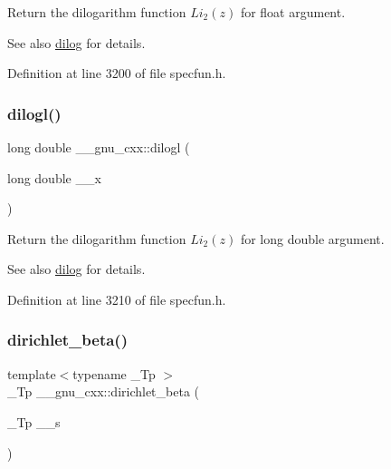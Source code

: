 Return the dilogarithm function $ Li_2(z) $ for {\ttfamily float} argument.

\begin{DoxySeeAlso}{See also}
\hyperlink{group__gnu__math__spec__func_ga4185ee1a0f9189a18085f65d52b6bc9b}{dilog} for details. 
\end{DoxySeeAlso}


Definition at line 3200 of file specfun.\+h.

\mbox{\label{group__gnu__math__spec__func_gae90c13ee690ebaf10a18a900fe2646f9}} 
\subsubsection{\texorpdfstring{dilogl()}{dilogl()}}
{\footnotesize\ttfamily long double \+\_\+\+\_\+gnu\+\_\+cxx\+::dilogl (\begin{DoxyParamCaption}\item[{long double}]{\+\_\+\+\_\+x }\end{DoxyParamCaption})\hspace{0.3cm}{\ttfamily [inline]}}

Return the dilogarithm function $ Li_2(z) $ for {\ttfamily long double} argument.

\begin{DoxySeeAlso}{See also}
\hyperlink{group__gnu__math__spec__func_ga4185ee1a0f9189a18085f65d52b6bc9b}{dilog} for details. 
\end{DoxySeeAlso}


Definition at line 3210 of file specfun.\+h.

\mbox{\label{group__gnu__math__spec__func_ga87466a2d429a2815d794acc21c882b08}} 
\subsubsection{\texorpdfstring{dirichlet\+\_\+beta()}{dirichlet\_beta()}}
{\footnotesize\ttfamily template$<$typename \+\_\+\+Tp $>$ \\
\+\_\+\+Tp \+\_\+\+\_\+gnu\+\_\+cxx\+::dirichlet\+\_\+beta (\begin{DoxyParamCaption}\item[{\+\_\+\+Tp}]{\+\_\+\+\_\+s }\end{DoxyParamCaption})\hspace{0.3cm}{\ttfamily [inline]}}

